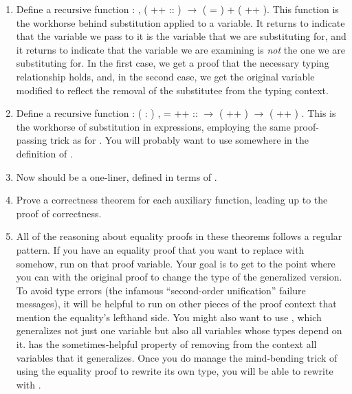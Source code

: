 \documentclass[12pt]{report}
\begin{document}
\begin{enumerate}
\begin{enumerate}
  \item Define a recursive function  : \coqdockw{\ensuremath{\forall}}    ,   ( ++  :: ) \ensuremath{\rightarrow} ( = ) +   ( ++ ).  This function is the workhorse behind substitution applied to a variable.  It returns  to indicate that the variable we pass to it is the variable that we are substituting for, and it returns  to indicate that the variable we are examining is \textit{not} the one we are substituting for.  In the first case, we get a proof that the necessary typing relationship holds, and, in the second case, we get the original variable modified to reflect the removal of the substitutee from the typing context.
  \item Define a recursive function  : \coqdockw{\ensuremath{\forall}}   ( :   )   ,  =  ++  ::  \ensuremath{\rightarrow}  ( ++ )  \ensuremath{\rightarrow}  ( ++ ) .  This is the workhorse of substitution in expressions, employing the same proof-passing trick as for .  You will probably want to use  somewhere in the definition of .
  \item Now  should be a one-liner, defined in terms of .
  \item Prove a correctness theorem for each auxiliary function, leading up to the proof of  correctness.
  \item All of the reasoning about equality proofs in these theorems follows a regular pattern.  If you have an equality proof that you want to replace with  somehow, run  on that proof variable.  Your goal is to get to the point where you can  with the original proof to change the type of the generalized version.  To avoid type errors (the infamous ``second-order unification'' failure messages), it will be helpful to run  on other pieces of the proof context that mention the equality's lefthand side.  You might also want to use  , which generalizes not just one variable but also all variables whose types depend on it.    has the sometimes-helpful property of removing from the context all variables that it generalizes.  Once you do manage the mind-bending trick of using the equality proof to rewrite its own type, you will be able to rewrite with .

\end{enumerate}
\end{enumerate}
\end{document}
